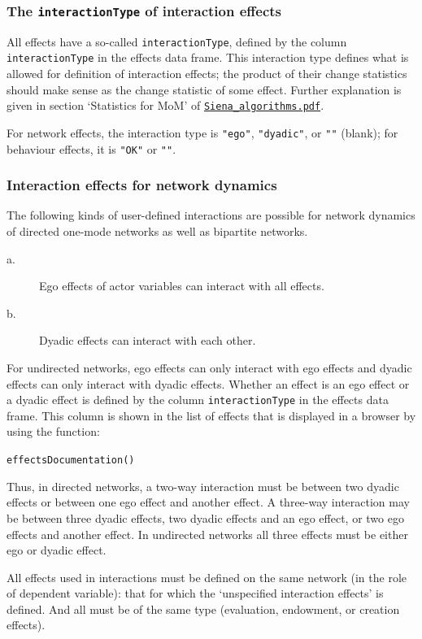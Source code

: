 \documentclass[a4paper,fleqn,11pt]{article}
\newcommand{\+}{\, + \,}
\begin{document}
\subsubsection{The \texttt{interactionType} of interaction effects}

All effects have a so-called  \texttt{interactionType},
defined by the column \texttt{interactionType} in the effects data frame.
This interaction type defines what is allowed for  definition of interaction effects;
the product of their change statistics should make sense as the change
statistic of some effect.
Further explanation is given in section `Statistics for MoM' of
\href{http://www.stats.ox.ac.uk/~snijders/siena/Siena_algorithms.pdf}{\texttt{Siena\_algorithms.pdf}}.

For network effects, the interaction type is \texttt{"ego"}, \texttt{"dyadic"},
or \texttt{""} (blank);
for behaviour effects, it is \texttt{"OK"} or \texttt{""}.


\subsubsection{Interaction effects for network dynamics}

The following kinds of user-defined interactions are possible
for network dynamics of directed one-mode networks
as well as bipartite networks.
\begin{description}
\item[a.]
  Ego effects of actor variables can interact with all effects.
  \item[b.] Dyadic effects can interact with each other.
\end{description}
For undirected networks, ego effects can only interact with ego effects and
dyadic effects can only interact with dyadic effects.
Whether an effect is an ego effect or a dyadic effect is defined by
the column \texttt{interactionType} in the effects data frame.
This column is shown in the list of effects that is displayed
in a browser by using the function:

\verb|effectsDocumentation()|
\bigskip

Thus, in directed networks, a two-way interaction must be between two dyadic
effects or between one ego effect and another effect. A three-way interaction
may be between three dyadic effects, two dyadic effects and an ego effect, or
two ego effects and another effect. In undirected networks all three effects
must be either ego or dyadic effect.

All effects used in interactions must be defined on the same network
(in the role of dependent variable): that for
which the `unspecified
interaction effects' is defined.  And all must be
of the same type (evaluation, endowment, or creation effects).
\end{document}
